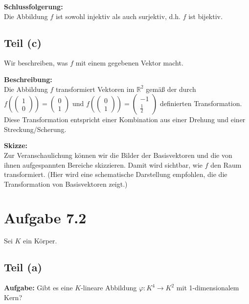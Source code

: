 \documentclass[11pt]{article}
\begin{document}
\textbf{Schlussfolgerung:} \\
Die Abbildung \( f \) ist sowohl injektiv als auch surjektiv, d.h. \( f \) ist bijektiv.

\subsection*{Teil (c)}

Wir beschreiben, was \( f \) mit einem gegebenen Vektor macht.

\textbf{Beschreibung:} \\
Die Abbildung \( f \) transformiert Vektoren im \( \mathbb{R}^2 \) gemäß der durch \( f\left(\begin{pmatrix} 1 \\ 0 \end{pmatrix}\right) = \begin{pmatrix} 0 \\ 1 \end{pmatrix} \) und \( f\left(\begin{pmatrix} 0 \\ 1 \end{pmatrix}\right) = \begin{pmatrix} -1 \\ \frac{1}{2} \end{pmatrix} \) definierten Transformation. Diese Transformation entspricht einer Kombination aus einer Drehung und einer Streckung/Scherung.

\textbf{Skizze:} \\
Zur Veranschaulichung können wir die Bilder der Basisvektoren und die von ihnen aufgespannten Bereiche skizzieren. Damit wird sichtbar, wie \( f \) den Raum transformiert. (Hier wird eine schematische Darstellung empfohlen, die die Transformation von Basisvektoren zeigt.)

\section*{Aufgabe 7.2}

Sei \( K \) ein Körper.

\subsection*{Teil (a)}

\textbf{Aufgabe:} Gibt es eine \( K \)-lineare Abbildung \( \varphi : K^4 \to K^2 \) mit 1-dimensionalem Kern?
\end{document}
